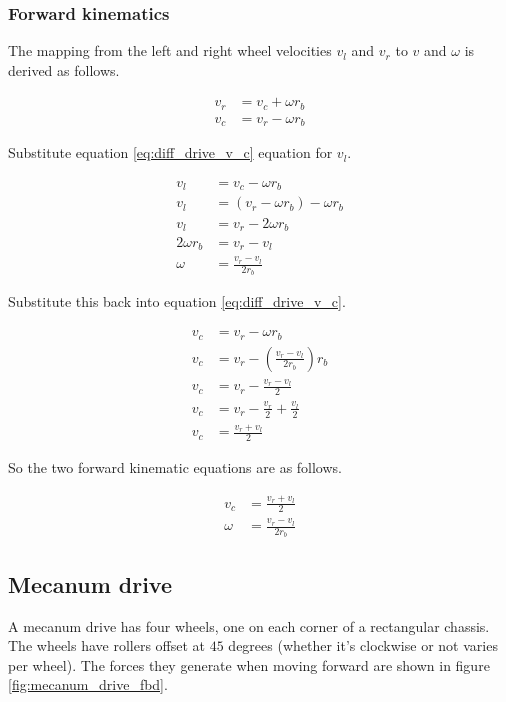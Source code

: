 \subsubsection{Forward kinematics}

The mapping from the left and right wheel velocities $v_l$ and $v_r$ to $v$ and
$\omega$ is derived as follows.

\begin{align}
  v_r &= v_c + \omega r_b \nonumber \\
  v_c &= v_r - \omega r_b \label{eq:diff_drive_v_c}
\end{align}

Substitute equation \eqref{eq:diff_drive_v_c} equation for $v_l$.

\begin{align*}
  v_l &= v_c - \omega r_b \\
  v_l &= (v_r - \omega r_b) - \omega r_b \\
  v_l &= v_r - 2\omega r_b \\
  2\omega r_b &= v_r - v_l \\
  \omega &= \frac{v_r - v_l}{2 r_b}
\end{align*}

Substitute this back into equation \eqref{eq:diff_drive_v_c}.

\begin{align*}
  v_c &= v_r - \omega r_b \\
  v_c &= v_r - \left(\frac{v_r - v_l}{2 r_b}\right) r_b \\
  v_c &= v_r - \frac{v_r - v_l}{2} \\
  v_c &= v_r - \frac{v_r}{2} + \frac{v_l}{2} \\
  v_c &= \frac{v_r + v_l}{2}
\end{align*}

So the two forward kinematic equations are as follows.

\begin{align}
  v_c &= \frac{v_r + v_l}{2} \\
  \omega &= \frac{v_r - v_l}{2 r_b}
\end{align}

\subsection{Mecanum drive}

A mecanum drive has four wheels, one on each corner of a rectangular chassis.
The wheels have rollers offset at $45$ degrees (whether it's clockwise or not
varies per wheel). The forces they generate when moving forward are shown in
figure \ref{fig:mecanum_drive_fbd}.

